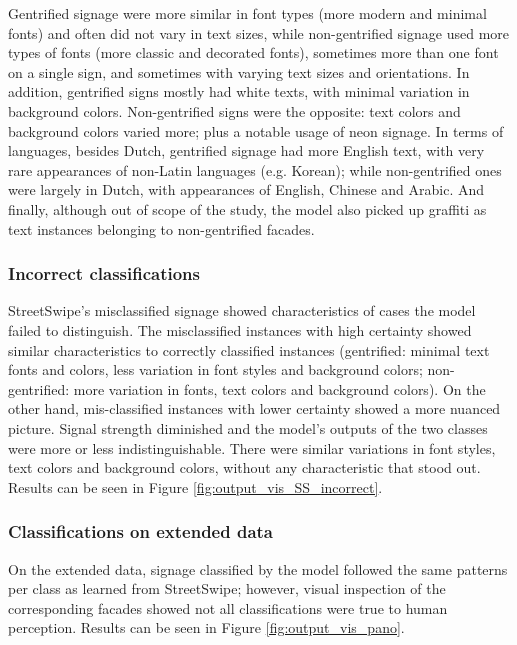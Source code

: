 Gentrified signage were more similar in font types (more modern and minimal fonts) and often did not vary in text sizes, while non-gentrified signage used more types of fonts (more classic and decorated fonts), sometimes more than one font on a single sign, and sometimes with varying text sizes and orientations. In addition, gentrified signs mostly had white texts, with minimal variation in background colors. Non-gentrified signs were the opposite: text colors and background colors varied more; plus a notable usage of neon signage. In terms of languages, besides Dutch, gentrified signage had more English text, with very rare appearances of non-Latin languages (e.g. Korean); while non-gentrified ones were largely in Dutch, with appearances of English, Chinese and Arabic. And finally, although out of scope of the study, the model also picked up graffiti as text instances belonging to non-gentrified facades.


\subsubsection{Incorrect classifications} 

StreetSwipe's misclassified signage showed characteristics of cases the model failed to distinguish. The misclassified instances with high certainty showed similar characteristics to correctly classified instances (gentrified: minimal text fonts and colors, less variation in font styles and background colors; non-gentrified: more variation in fonts, text colors and background colors). On the other hand, mis-classified instances with lower certainty showed a more nuanced picture. Signal strength diminished and the model's outputs of the two classes were more or less indistinguishable. There were similar variations in font styles, text colors and background colors, without any characteristic that stood out. Results can be seen in Figure \ref{fig:output_vis_SS_incorrect}.


\subsubsection{Classifications on extended data}

On the extended data, signage classified by the model followed the same patterns per class as learned from StreetSwipe; however, visual inspection of the corresponding facades showed not all classifications were true to human perception. Results can be seen in Figure \ref{fig:output_vis_pano}.

